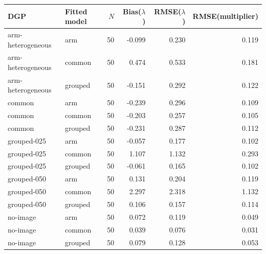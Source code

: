 \begin{tabular}{llrrrr}
\toprule
DGP & Fitted model & $N$ & Bias($\lambda$) & RMSE($\lambda$) & RMSE(multiplier) \\
\midrule
arm-heterogeneous & arm & 50 & -0.099 & 0.230 & 0.119 \\
arm-heterogeneous & common & 50 & 0.474 & 0.533 & 0.181 \\
arm-heterogeneous & grouped & 50 & -0.151 & 0.292 & 0.122 \\
common & arm & 50 & -0.239 & 0.296 & 0.109 \\
common & common & 50 & -0.203 & 0.257 & 0.105 \\
common & grouped & 50 & -0.231 & 0.287 & 0.112 \\
grouped-025 & arm & 50 & -0.057 & 0.177 & 0.102 \\
grouped-025 & common & 50 & 1.107 & 1.132 & 0.293 \\
grouped-025 & grouped & 50 & -0.061 & 0.165 & 0.102 \\
grouped-050 & arm & 50 & 0.131 & 0.204 & 0.119 \\
grouped-050 & common & 50 & 2.297 & 2.318 & 1.132 \\
grouped-050 & grouped & 50 & 0.106 & 0.157 & 0.114 \\
no-image & arm & 50 & 0.072 & 0.119 & 0.049 \\
no-image & common & 50 & 0.039 & 0.076 & 0.031 \\
no-image & grouped & 50 & 0.079 & 0.128 & 0.053 \\
\bottomrule
\end{tabular}

